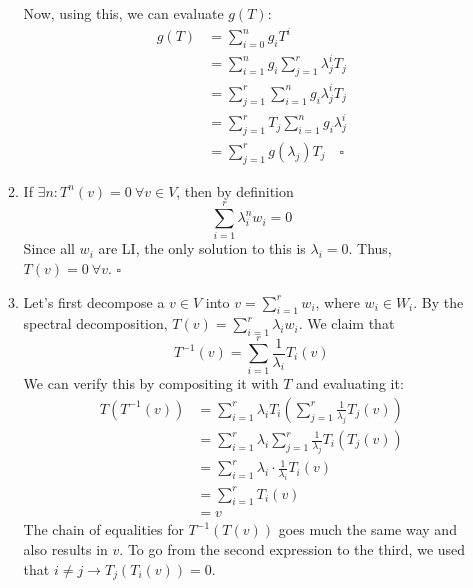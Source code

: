 \documentclass[12pt]{article}
\begin{document}
\begin{enumerate}
\begin{enumerate}
                        Now, using this, we can evaluate $g(T)$:
                        \begin{align*}
                              g(T) & = \sum_{i=0}^{n} g_i T^i                            \\
                                   & = \sum_{i=1}^{n} g_i \sum_{j=1}^{r} \lambda_j^i T_j \\
                                   & = \sum_{j=1}^{r} \sum_{i=1}^{n} g_i \lambda_j^i T_j \\
                                   & = \sum_{j=1}^{r} T_j \sum_{i=1}^{n} g_i \lambda_j^i \\
                                   & = \sum_{j=1}^{r} g(\lambda_j)T_j\quad\square
                        \end{align*}
                  \item If $\exists n: T^n(v)=0\ \forall v \in V$, then by definition
                        \[\sum_{i=1}^{r} \lambda_i^n w_i=0\]
                        Since all $w_i$ are LI, the only solution to this is $\lambda_i=0$.
                        Thus, $T(v)=0\ \forall v$. $\square$
                        \setcounter{enumii}{4}
                  \item Let's first decompose a $v \in V$ into $v=\sum_{i=1}^{r} w_i$, where $w_i \in W_i$.
                        By the spectral decomposition, $T(v)=\sum_{i=1}^{r} \lambda_i w_i$.
                        We claim that \[T^{-1}(v)=\sum_{i=1}^{r} \frac{1}{\lambda_i} T_i(v)\]
                        We can verify this by compositing it with $T$ and evaluating it:
                        \begin{align*}
                              T(T^{-1}(v)) & = \sum_{i=1}^{r} \lambda_i T_i\left(\sum_{j=1}^{r} \frac{1}{\lambda_j} T_j(v)\right) \\
                                           & = \sum_{i=1}^{r} \lambda_i \sum_{j=1}^{r} \frac{1}{\lambda_j} T_i(T_j(v))            \\
                                           & = \sum_{i=1}^{r} \lambda_i \cdot \frac{1}{\lambda_i} T_i(v)                          \\
                                           & = \sum_{i=1}^{r} T_i(v)                                                              \\
                                           & = v
                        \end{align*}
                        The chain of equalities for $T^{-1}(T(v))$ goes much the same way and also results in $v$.
                        To go from the second expression to the third, we used that $i \ne j \rightarrow T_j(T_i(v))=0$.


\end{enumerate}
\end{enumerate}
\end{document}
